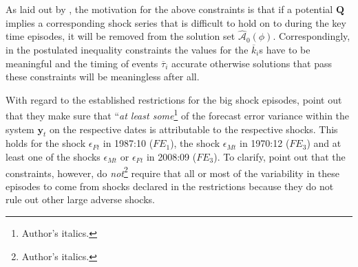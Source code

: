 \documentclass[a4paper,11pt,listof=nochaptergap,oneside,pointednumbers,bibtotoc,bigheadings,liststotoc,hidelinks]{scrbook}
\theoremstyle{mysatz}
\theoremstyle{mydefinition}
\theoremstyle{mytheorem}
\theoremstyle{mybemerkung}
\let\oldhat\hat
\newcommand{\vect}[1]{\boldsymbol{\mathbf{#1}}}
\newcommand{\hatt}[1]{\oldhat{\boldsymbol{\mathbf{#1}}}}
\begin{document}
As laid out by \citet{ludvigsonetal:19}, the motivation for the above constraints is that if a potential $\vect{Q}$ implies a corresponding shock series that is difficult to hold on to during the key time episodes, it will be removed from the solution set $\hatt{\mathcal{A}}_0(\phi)$. Correspondingly, in the postulated inequality constraints the values for the $\overline{k}_i$s have to be meaningful and the timing of events $\overline{\tau}_i$ accurate otherwise solutions that pass these constraints will be meaningless after all.

With regard to the established restrictions for the big shock episodes, \citet[p. 12]{ludvigsonetal:19} point out that they make sure that ``\textit{at least some}\footnote{Author's italics.} of the forecast error variance within the system $\vect{y}_t$ on the respective dates is attributable to the respective shocks. This holds for the shock $\epsilon_{Ft}$ in 1987:10 ($FE_1$), the shock $\epsilon_{Mt}$ in 1970:12 ($FE_3$) and at least one of the shocks $\epsilon_{Mt}$ or $\epsilon_{Ft}$ in 2008:09 ($FE_3$). To clarify, \citet{ludvigsonetal:19} point out that the constraints, however, do \textit{not}\footnote{Author's italics.} require that all or most of the variability in these episodes to come from shocks declared in the restrictions because they do not rule out other large adverse shocks.
\\
\end{document}
